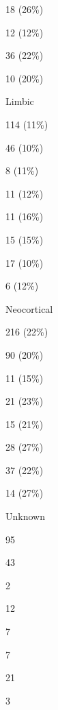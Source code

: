\documentclass[]{book}
\begin{document}
18 (26\%)

12 (12\%)

36 (22\%)

10 (20\%)

Limbic

114 (11\%)

46 (10\%)

8 (11\%)

11 (12\%)

11 (16\%)

15 (15\%)

17 (10\%)

6 (12\%)

Neocortical

216 (22\%)

90 (20\%)

11 (15\%)

21 (23\%)

15 (21\%)

28 (27\%)

37 (22\%)

14 (27\%)

Unknown

95

43

2

12

7

7

21

3
\end{document}
